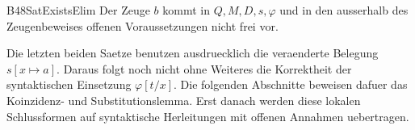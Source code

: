 {B48SatExistsElim}{
}
Der Zeuge \(b\) kommt in \(Q,M,D,s,\varphi\) und in den ausserhalb
des Zeugenbeweises offenen Voraussetzungen nicht frei vor.
\begin{tabproof}
 {}
 {}
\end{tabproof}

\noindent
Die letzten beiden Saetze benutzen ausdruecklich die veraenderte
Belegung \(s[x\mapsto a]\). Daraus folgt noch nicht ohne Weiteres
die Korrektheit der syntaktischen Einsetzung \(\varphi[t/x]\).
Die folgenden Abschnitte beweisen dafuer das Koinzidenz- und
Substitutionslemma. Erst danach werden diese lokalen Schlussformen
auf syntaktische Herleitungen mit offenen Annahmen uebertragen.
